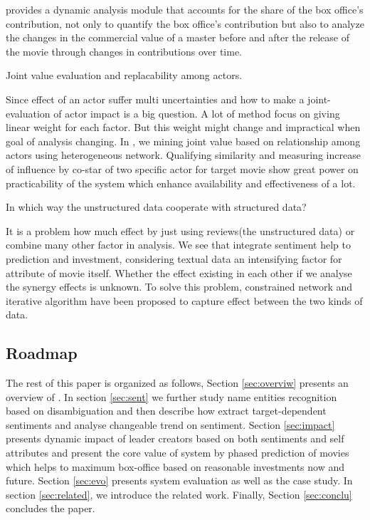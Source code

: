 \system provides a dynamic analysis module that accounts for the share of the box office's contribution, not only to quantify the box office's contribution but also to analyze the changes in the commercial value of a master before and after the release of the movie through changes in contributions over time.
\begin{difficulties} Joint value evaluation and replacability among actors.\end{difficulties}
\par Since effect of an actor suffer multi uncertainties and how to make a joint-evaluation of actor impact is a big question. A lot of method focus on giving linear weight for each factor. But this weight might change and impractical when goal of analysis changing. In \system, we mining joint value based on relationship among actors using heterogeneous network. Qualifying similarity and measuring increase of influence by co-star of two specific actor for target movie show great power on practicability of the system which enhance availability and effectiveness of \system a lot.
\begin{difficulties}
In which way the unstructured data cooperate with structured data?
\end{difficulties}
\par It is a  problem how much effect by just using reviews(the unstructured data) or combine many other factor in analysis. We see that integrate sentiment help to prediction and investment, considering textual data an intensifying factor for attribute of movie itself. Whether the effect existing in each other if we analyse the synergy effects is unknown. To solve this problem, constrained network and iterative algorithm have been proposed to capture effect between the two kinds of data.

\subsection{Roadmap}
The rest of this paper is organized as follows, Section \ref{sec:overviw} presents an overview of \system. In section \ref{sec:sent} we further study name entities recognition based on disambiguation and then describe how \system extract target-dependent sentiments and analyse changeable trend on sentiment. Section \ref{sec:impact} presents dynamic impact of leader creators based on both sentiments and self attributes and present the core value of system by phased prediction of movies which helps to maximum box-office based on reasonable investments now and future. Section \ref{sec:evo} presents system evaluation as well as the case study. In section \ref{sec:related}, we introduce the related work. Finally, Section \ref{sec:conclu} concludes the paper. 